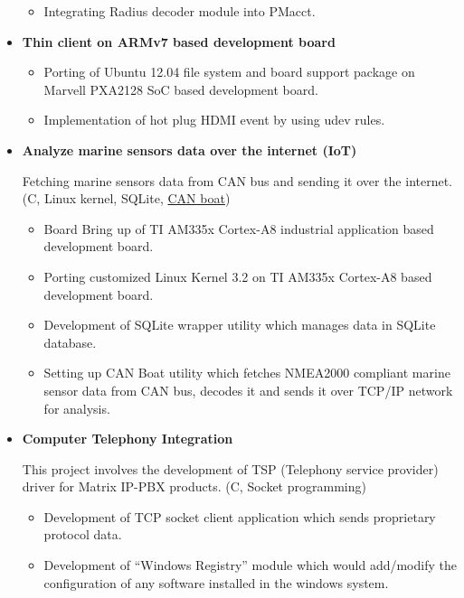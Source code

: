 \documentclass[letterpaper,10pt]{article}
\newcommand{\resitem}[1]{\item #1 \vspace{-2pt}}
\begin{document}
\begin{itemize}
\begin{itemize}
		\resitem{Integrating Radius decoder module into PMacct.}
	\end{itemize}
	
\item
    \textbf{Thin client on ARMv7 based development board}
    
	\begin{itemize}
	    \resitem{Porting of Ubuntu 12.04 file system and board support package on Marvell PXA2128 SoC based development board.}
	    
	    \resitem{Implementation of hot plug HDMI event by using udev rules.}
	    
	\end{itemize}
	
\item
    \textbf{Analyze marine sensors data over the internet (IoT)}
	
    Fetching marine sensors data from CAN bus and sending it over the internet. (C, Linux kernel, SQLite, \href{https://github.com/mehul-m-prajapati/canboa}{CAN boat})
    
	\begin{itemize}
	    \resitem{Board Bring up of TI AM335x Cortex-A8 industrial application based development board.}
	
	    \resitem{Porting customized Linux Kernel 3.2 on TI AM335x Cortex-A8 based development board.}
	    
	    \resitem{Development of SQLite wrapper utility which manages data in SQLite database.}
	    
	    \resitem{Setting up CAN Boat utility which fetches NMEA2000 compliant marine sensor data from CAN bus, decodes it and sends it over TCP/IP network for analysis.}

	\end{itemize}
	
\item
   \textbf{Computer Telephony Integration}
    
    This project involves the development of TSP (Telephony service provider) driver for Matrix IP-PBX products. (C, Socket programming)
    
	\begin{itemize}
	    \resitem{Development of TCP socket client application which sends proprietary protocol data.}
	    
	    \resitem{Development of “Windows Registry” module which would add/modify the configuration of any software installed in the windows system.}
	    

\end{itemize}
\end{itemize}
\end{document}
